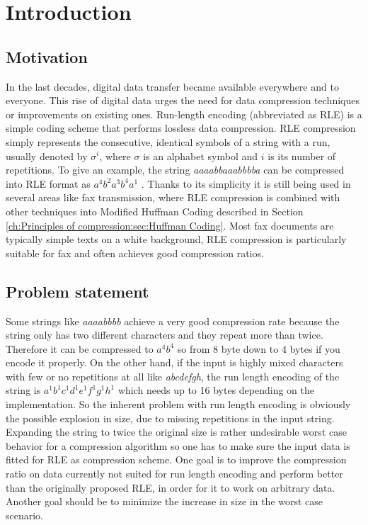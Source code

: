 
\chapter{Introduction}
\label{ch:Introduction}
\section{Motivation}
\label{ch:Introduction:sec:Motivation}
\par{
In the last decades, digital data transfer became available everywhere and to everyone. This rise of digital data urges the need for data compression techniques or improvements on existing ones. Run-length encoding \cite{rle-patent} (abbreviated as RLE) is a simple coding scheme that performs lossless data compression. RLE compression simply represents the consecutive, identical symbols of a string with a run, usually denoted by $\sigma^i$, where $\sigma$ is an alphabet symbol and $i$ is its number of repetitions. To give an example, the string \emph{aaaabbaaabbbba} can be compressed into RLE format as  $ a^{4}b^{2}a^{3}b^{4}a^{1}$ . Thanks to its simplicity it is still being used in several areas like fax transmission, where RLE compression is combined with other techniques into Modified Huffman Coding \cite{fax-rle} described in Section \ref{ch:Principles of compression:sec:Huffman Coding}. Most fax documents are typically simple texts on a white background, RLE compression is particularly suitable for fax and often achieves good compression ratios.
}
\section{Problem statement}
\label{ch:Introduction:sec:Problem statement}
\par{
Some strings like \emph{aaaabbbb} achieve a very good compression rate because the string only has two different characters and they repeat more than twice. Therefore it can be compressed to $a^4b^4$ so from 8 byte down to 4 bytes if you encode it properly. On the other hand, if the input is highly mixed characters with few or no repetitions at all like \emph{abcdefgh}, the run length encoding of the string is $a^1b^1c^1d^1e^1f^1g^1h^1$ which needs up to 16 bytes depending on the implementation. So the inherent problem with run length encoding is obviously the possible explosion in size, due to missing repetitions in the input string. Expanding the string to twice the original size is rather undesirable worst case behavior for a compression algorithm so one has to make sure the input data is fitted for RLE as compression scheme. One goal is to improve the compression ratio on data currently not suited for run length encoding and perform better than the originally proposed RLE, in order for it to work on arbitrary data. Another goal should be to minimize the increase in size in the worst case scenario.}

